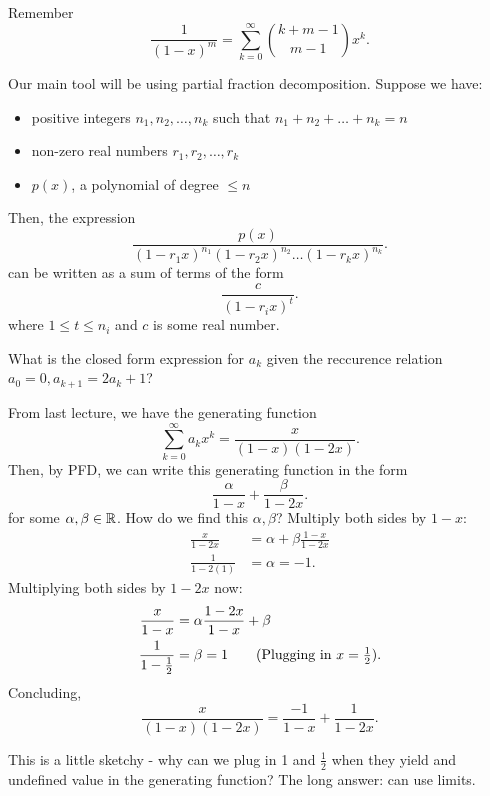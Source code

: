 
\begin{note}
	Remember \[
		\frac{1}{(1-x)^m} = \sum_{k=0}^{\infty}\binom{k+m-1}{m-1}x^{k} 
	.\] 
\end{note}

Our main tool will be using partial fraction decomposition. Suppose we have:
\begin{itemize}
	\item positive integers \( n_{1},n_{2},\ldots ,n_k \) such that \( n_{1}+n_{2}+\ldots +n_k=n \)
	\item non-zero real numbers \( r_{1},r_{2},\ldots ,r_k \)
	\item \( p(x) \), a polynomial of degree \( \le n \)
\end{itemize}
Then, the expression \[
		\frac{p(x)}{(1-r_{1}x)^{n_{1}}(1-r_{2}x)^{n_{2}}\ldots (1-r_kx)^{n_k}}
.\] can be written as a sum of terms of the form \[
	\frac{c}{(1-r_ix)^t}
.\] where \( 1 \le t\le n_i \) and \( c \) is some real number.

\begin{eg}
	What is the closed form expression for \( a_k \) given the reccurence relation \( a_{0}=0, a_{k+1}=2a_k + 1 \)?
\end{eg}

From last lecture, we have the generating function \[
	\sum_{k=0}^{\infty}a_{k}x^{k} = \frac{x}{(1-x)(1-2x)}
.\] Then, by PFD, we can write this generating function in the form \[
	\frac{\alpha}{1-x} + \frac{\beta}{1-2x}
.\] for some \( \alpha,\beta \in \mathbb{R} \). How do we find this \( \alpha ,\beta  \)? Multiply both sides by \( 1-x \):
\begin{align*}
	\frac{x}{1-2x} &= \alpha  + \beta \frac{1-x}{1-2x} \\
	\frac{1}{1-2(1)} &= \alpha = -1 \tag{Plugging in \( x=1 \)}
.\end{align*}
Multiplying both sides by \( 1-2x \) now:
\begin{align*}
	\frac{x}{1-x} &= \alpha \frac{1-2x}{1-x} + \beta \\
	\frac{1}{1-\frac{1}{2}} &= \beta = 1 \tag{Plugging in \( x=\frac{1}{2} \)}
.\end{align*}
Concluding,\[
	\frac{x}{(1-x)(1-2x)} = \frac{-1}{1-x} + \frac{1}{1-2x}
.\] 

\begin{note}
	This is a little sketchy - why can we plug in 1 and \( \frac{1}{2} \) when they yield and undefined value in the generating function? The long answer: can use limits.
\end{note}


